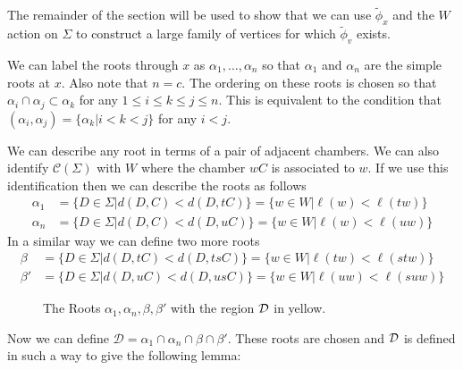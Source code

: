 \documentclass[class=book, crop=false,12 pt]{standalone}
\begin{document}
The remainder of the section will be used to show that we can use $\tilde{\phi}_x$ and the $W$ action on $\Sigma$ to construct a large family of vertices for which $\tilde{\phi}_v$ exists.


We can label the roots through $x$ as $\alpha_1,\dots,\alpha_n$ so that $\alpha_1$ and $\alpha_n$ are the simple roots at $x.$ Also note that $n=c.$ The ordering on these roots is chosen so that $\alpha_i\cap \alpha_j\subset \alpha_k$ for any $1\le i \le k \le j\le n.$ This is equivalent to the condition that $(\alpha_i,\alpha_j)=\{\alpha_k|i<k<j\}$ for any $i<j.$

We can describe any root in terms of a pair of adjacent chambers. We can also identify $\mathcal{C}(\Sigma)$ with $W$ where the chamber $wC$ is associated to $w.$ If we use this identification then we can describe the roots as follows
\begin{align*}
	\alpha_1&=\{D\in \Sigma|d(D,C)<d(D,tC)\}=\{w\in W|\ell(w)<\ell(tw)\}\\
	\alpha_n&=\{D\in \Sigma|d(D,C)<d(D,uC)\}=\{w\in W|\ell(w)<\ell(uw)\}
\end{align*}
In a similar way we can define two more roots
\begin{align*}
	\beta&=\{D\in \Sigma|d(D,tC)<d(D,tsC)\}=\{w\in W|\ell(tw)<\ell(stw)\}\\
	\beta'&=\{D\in \Sigma|d(D,uC)<d(D,usC)\}=\{w\in W|\ell(uw)<\ell(suw)\}
\end{align*}
\begin{figure}[h]
	\label{defineD}
	\begin{center}
	\caption{The Roots $\alpha_1,\alpha_n,\beta,\beta'$ with the region $\mathcal{D}$ in yellow.}
\end{center}
\end{figure}

Now we can define $\mathcal{D}=\alpha_1\cap \alpha_n \cap \beta\cap \beta'.$ These roots are chosen and $\mathcal{D}$ is defined in such a way to give the following lemma:
\end{document}
